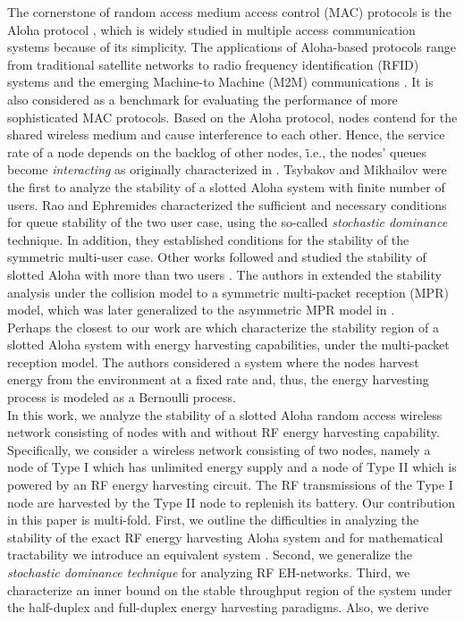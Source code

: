 \documentclass[draftcls,12pt,onecolumn]{IEEEtran}
\begin{document}
\newline \indent The cornerstone of random access medium access control (MAC) protocols is the Aloha protocol \cite{abramson1970aloha}, which is widely studied in multiple access communication systems because of its simplicity. The applications of Aloha-based protocols range from traditional satellite networks \cite{okada1977analysis} to radio frequency identification (RFID) systems \cite{zhu2011critical} and the emerging Machine-to Machine (M2M) communications \cite{wu2013fasa}. It is also considered as a benchmark for evaluating the performance of more sophisticated MAC protocols. Based on the Aloha protocol, nodes contend for the shared wireless medium and cause interference to each other. Hence, the service rate of a node depends on the backlog of other nodes, \.i.e., the nodes' queues become \emph{interacting} as originally characterized in \cite{fayolle1979two}. Tsybakov and Mikhailov \cite{tsybakov1979ergodicity} were the first to analyze the stability of a slotted Aloha system with finite number of users. Rao and Ephremides \cite{rao1988stability} characterized the sufficient and necessary conditions for queue stability of the two user case, using the so-called \emph{stochastic dominance} technique. In addition, they established conditions for the stability of the symmetric multi-user case. Other works followed and studied the stability of slotted Aloha with more than two users \cite{luo1999stability, bordenave2012asymptotic,kompalli2013stability,szpankowski}. The authors in \cite{ghez1988stability} extended the stability analysis under the collision model to a symmetric multi-packet reception (MPR) model, which was later generalized to the asymmetric MPR model in \cite{naware2005stability}.\\ 
\indent Perhaps the closest to our work are \cite{jeon2011stability,jeon2015stability} which characterize the stability region of a slotted Aloha system with energy harvesting capabilities, under the multi-packet reception model. The authors considered a system where the nodes harvest energy from the environment at a fixed rate and, thus, the energy harvesting process is modeled as a Bernoulli process.\\
\indent In this work, we analyze the stability of a slotted Aloha random access wireless network consisting of nodes with and without RF energy harvesting capability. Specifically, we consider a wireless network consisting of two nodes, namely a node of Type I which has unlimited energy supply and a node of Type II which is powered by an RF energy harvesting circuit. The RF transmissions of the Type I node are harvested by the Type II node to replenish its battery. Our contribution in this paper is multi-fold. First, we outline the difficulties in analyzing the stability of the exact RF energy harvesting Aloha system  and for mathematical tractability we introduce an equivalent system . Second, we generalize the \emph{stochastic dominance technique} for analyzing RF EH-networks. Third, we characterize an inner bound on the stable throughput region of the system  under the half-duplex and full-duplex energy harvesting paradigms. Also, we derive 
\end{document}
